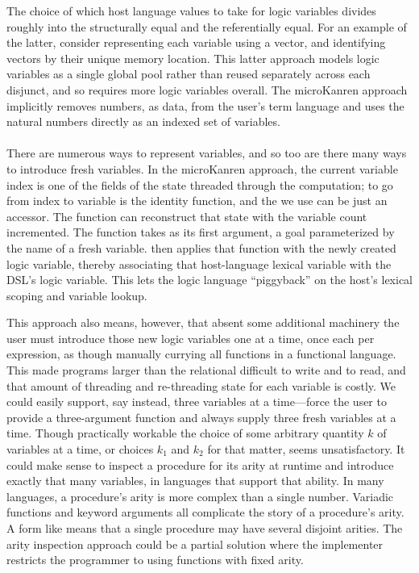 \documentclass[sigplan,balance,pbalance,natbib=false]{acmart}
\begin{document}
The choice of which host language values to take for logic variables
divides roughly into the structurally equal and the referentially
equal. For an example of the latter, consider representing each
variable using a vector, and identifying vectors by their unique
memory location. This latter approach models logic variables as a
single global pool rather than reused separately across each disjunct,
and so requires more logic variables overall. The microKanren approach
implicitly removes numbers, as data, from the user's term language and
uses the natural numbers directly as an indexed set of variables.

\paragraph{}

There are numerous ways to represent variables, and so too are there
many ways to introduce fresh variables. In the microKanren approach,
the current variable index is one of the fields of the state threaded
through the computation; to go from index to variable is the identity
function, and the  we use can be just an
accessor. The function  can reconstruct that
state with the variable count incremented. The 
function takes as its first argument, a goal parameterized by the name
of a fresh variable.  then applies that
function with the newly created logic variable, thereby associating
that host-language lexical variable with the DSL's logic variable.
This lets the logic language \enquote{piggyback} on the host's lexical
scoping and variable lookup.

This approach also means, however, that absent some additional
machinery the user must introduce those new logic variables one at a
time, once each per  expression, as though
manually currying all functions in a functional language. This made
programs larger than the relational  difficult to
write and to read, and that amount of threading and re-threading state
for each variable is costly. We could easily support, say instead,
three variables at a time---force the user to provide a three-argument
function and always supply three fresh variables at a time. Though
practically workable the choice of some arbitrary quantity $k$ of
variables at a time, or choices $k_{1}$ and $k_{2}$ for that matter,
seems unsatisfactory. It could make sense to inspect a procedure for
its arity at runtime and introduce exactly that many variables, in
languages that support that ability. In many languages, a procedure's
arity is more complex than a single number. Variadic functions and
keyword arguments all complicate the story of a procedure's arity. A
form like  means that a single procedure may
have several disjoint arities. The arity inspection approach could be
a partial solution where the implementer restricts the programmer to
using functions with fixed arity.
\end{document}
